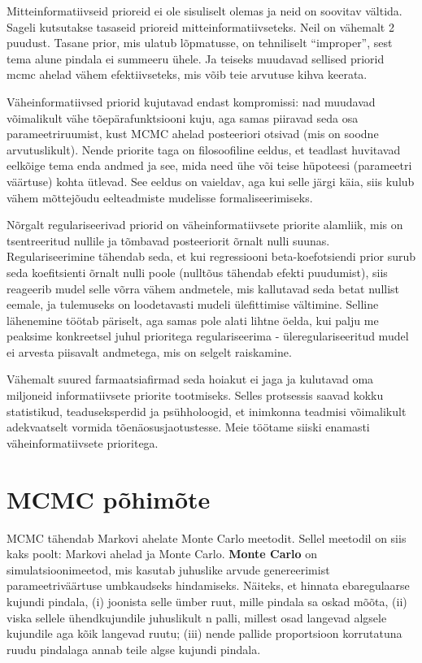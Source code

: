 \documentclass[]{book}
\begin{document}
Mitteinformatiivseid prioreid ei ole sisuliselt olemas ja neid on soovitav vältida.
Sageli kutsutakse tasaseid prioreid mitteinformatiivseteks.
Neil on vähemalt 2 puudust.
Tasane prior, mis ulatub lõpmatusse, on tehniliselt ``improper'', sest tema alune pindala ei summeeru ühele.
Ja teiseks muudavad sellised priorid mcmc ahelad vähem efektiivseteks, mis võib teie arvutuse kihva keerata.

Väheinformatiivsed priorid kujutavad endast kompromissi: nad muudavad võimalikult vähe tõepärafunktsiooni kuju, aga samas piiravad seda osa parameetriruumist, kust MCMC ahelad posteeriori otsivad (mis on soodne arvutuslikult).
Nende priorite taga on filosoofiline eeldus, et teadlast huvitavad eelkõige tema enda andmed ja see, mida need ühe või teise hüpoteesi (parameetri väärtuse) kohta ütlevad.
See eeldus on vaieldav, aga kui selle järgi käia, siis kulub vähem mõttejõudu eelteadmiste mudelisse formaliseerimiseks.

Nõrgalt regulariseerivad priorid on väheinformatiivsete priorite alamliik, mis on tsentreeritud nullile ja tõmbavad posteeriorit õrnalt nulli suunas. Regulariseerimine tähendab seda, et kui regressiooni beta-koefotsiendi prior surub seda koefitsienti õrnalt nulli poole (nulltõus tähendab efekti puudumist), siis reageerib mudel selle võrra vähem andmetele, mis kallutavad seda betat nullist eemale, ja tulemuseks on loodetavasti mudeli ülefittimise vältimine. Selline lähenemine töötab päriselt, aga samas pole alati lihtne öelda, kui palju me peaksime konkreetsel juhul prioritega regulariseerima - üleregulariseeritud mudel ei arvesta piisavalt andmetega, mis on selgelt raiskamine.

Vähemalt suured farmaatsiafirmad seda hoiakut ei jaga ja kulutavad oma miljoneid informatiivsete priorite tootmiseks.
Selles protsessis saavad kokku statistikud, teaduseksperdid ja psühholoogid, et inimkonna teadmisi võimalikult adekvaatselt vormida tõenäosusjaotustesse.
Meie töötame siiski enamasti väheinformatiivsete prioritega.

\hypertarget{mcmc-pohimote}{%
\chapter{MCMC põhimõte}\label{mcmc-pohimote}}

MCMC tähendab Markovi ahelate Monte Carlo meetodit. Sellel meetodil on siis kaks poolt: Markovi ahelad ja Monte Carlo. \textbf{Monte Carlo} on simulatsioonimeetod, mis kasutab juhuslike arvude genereerimist parameetriväärtuse umbkaudseks hindamiseks. Näiteks, et hinnata ebaregulaarse kujundi pindala, (i) joonista selle ümber ruut, mille pindala sa oskad mõõta, (ii) viska sellele ühendkujundile juhuslikult n palli, millest osad langevad algsele kujundile aga kõik langevad ruutu; (iii) nende pallide proportsioon korrutatuna ruudu pindalaga annab teile algse kujundi pindala.
\end{document}
